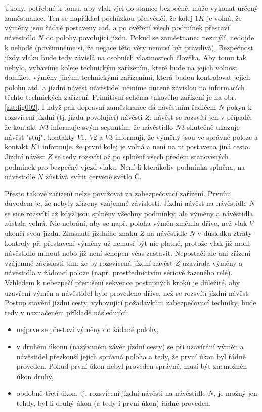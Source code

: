 {  Úkony, potřebné k tomu, aby vlak vjel do stanice bezpečně, může vykonat určený zaměstnanec. Ten
  se například pochůzkou přesvědčí, že kolej \(1K\) je volná, že výměny jsou řádně postaveny atd. a 
  po ověření všech podmínek přestaví návěstidlo \(N\) do polohy povolující jízdu. Pokud se 
  zaměstnanec nezmýlí, nedojde k nehodě (povšimněme si, že negace této věty nemusí být pravdivá). 
  Bezpečnost jízdy vlaku bude tedy závislá na osobních vlastnostech člověka. Aby tomu tak nebylo, 
  vybavíme koleje technickým zařízením, které bude na jejich volnost dohlížet, výměny jinými
  technickými zařízeními, která budou kontrolovat jejich polohu atd. a jízdní návěst návěstidel
  učiníme nuceně závislou na informacích těchto technických zařízení. Primitivní schéma
  takového zařízení je na obr. \ref{zzt:fig002}. I když pak dopravní zaměstnanec dá návěstním 
  řadičem \(N\) pokyn k rozsvícení jízdní (tj. jízdu povolující) návěsti \(Z\), návěst se rozsvítí 
  jen v případě, že kontakt \(N3\) informuje svým sepnutím, že návěstidlo \(N3\) skutečně ukazuje 
  návěst "stůj", kontakty \(V1\), \(V2\) a \(V3\) informují, že výměny jsou ve správné poloze a 
  kontakt \(K1\) informuje, že první kolej je volná a není na ni postavena jiná cesta. Jízdní 
  návěst \(Z\) se tedy rozsvítí až po splnění všech předem stanovených podmínek pro bezpečný vjezd 
  vlaku. Není-li kterákoliv podmínka splněna, na návěstidle \(N\) zůstává svítit červené světlo Č. 
  
  Přesto takové zařízení nelze považovat za zabezpečovací zařízení. Prvním důvodem je, že nebyly
  zřízeny vzájemné závislosti. Jízdní návěst na návěstidle \(N\) se sice rozsvítí až když jsou 
  splněny všechny podmínky, ale výměny a návěstidla zůstala volná. Nic nebrání, aby se např. poloha 
  výměn změnila dříve, než vlak \(V\) ukončí svou jízdu. Zhasnutí jízdního znaku \(Z\) na 
  návěstidle \(N\) v důsledku ztráty kontroly při přestavení výměny už nemusí být nic platné, 
  protože vlak již mohl návěstidlo minout nebo již není schopen včas zastavit. Nepostačí ale ani 
  zřízení vzájemné závislosti tím, že by rozsvícená jízdní návěst \(Z\) uzavírala výměny a 
  návěstidla v žádoucí poloze (např. prostřednictvím sériově řazeného relé). Vzhledem k nebezpečí
  přerušení sekvence postupných kroků je důležité, aby uzavření výměn a návěstidel bylo provedeno 
  dříve, než se rozsvítí jízdní návěst. Postup stavění jízdní cesty, vyhovující požadavkům 
  zabezpečovací techniky, bude tedy v naznačeném příkladě následující:
  \begin{itemize}
    \item nejprve se přestaví výměny do žádané polohy,
    \item v druhém úkonu (nazývaném závěr jízdní cesty) se při uzavírání výměn a návěstidel 
          přezkouší jejich správná poloha a tedy, že první úkon byl řádně proveden. Pokud první 
          úkon nebyl proveden správně, musí být znemožněn úkon druhý,
    \item obdobně třetí úkon, tj. rozsvícení jízdní návěsti na návěstidle \(N\), je možný jen 
          tehdy, byl-li druhý úkon (a tedy i první úkon) řádně proveden. 
  \end{itemize}
  
}
